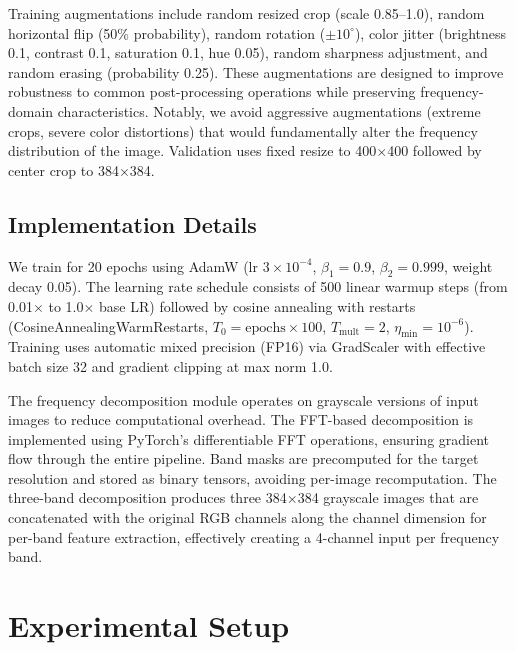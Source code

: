 \documentclass[journal]{IEEEtran}
\begin{document}
Training augmentations include random resized crop (scale 0.85--1.0), random horizontal flip (50\% probability), random rotation ($\pm 10^\circ$), color jitter (brightness 0.1, contrast 0.1, saturation 0.1, hue 0.05), random sharpness adjustment, and random erasing (probability 0.25). These augmentations are designed to improve robustness to common post-processing operations while preserving frequency-domain characteristics. Notably, we avoid aggressive augmentations (extreme crops, severe color distortions) that would fundamentally alter the frequency distribution of the image. Validation uses fixed resize to 400$\times$400 followed by center crop to 384$\times$384.

\subsection{Implementation Details}
We train for 20 epochs using AdamW (lr $3\times10^{-4}$, $\beta_1=0.9$, $\beta_2=0.999$, weight decay 0.05). The learning rate schedule consists of 500 linear warmup steps (from 0.01$\times$ to 1.0$\times$ base LR) followed by cosine annealing with restarts (CosineAnnealingWarmRestarts, $T_0 = \text{epochs} \times 100$, $T_{\text{mult}} = 2$, $\eta_{\min} = 10^{-6}$). Training uses automatic mixed precision (FP16) via GradScaler with effective batch size 32 and gradient clipping at max norm 1.0.

The frequency decomposition module operates on grayscale versions of input images to reduce computational overhead. The FFT-based decomposition is implemented using PyTorch's differentiable FFT operations, ensuring gradient flow through the entire pipeline. Band masks are precomputed for the target resolution and stored as binary tensors, avoiding per-image recomputation. The three-band decomposition produces three 384$\times$384 grayscale images that are concatenated with the original RGB channels along the channel dimension for per-band feature extraction, effectively creating a 4-channel input per frequency band.

\section{Experimental Setup}
\end{document}
